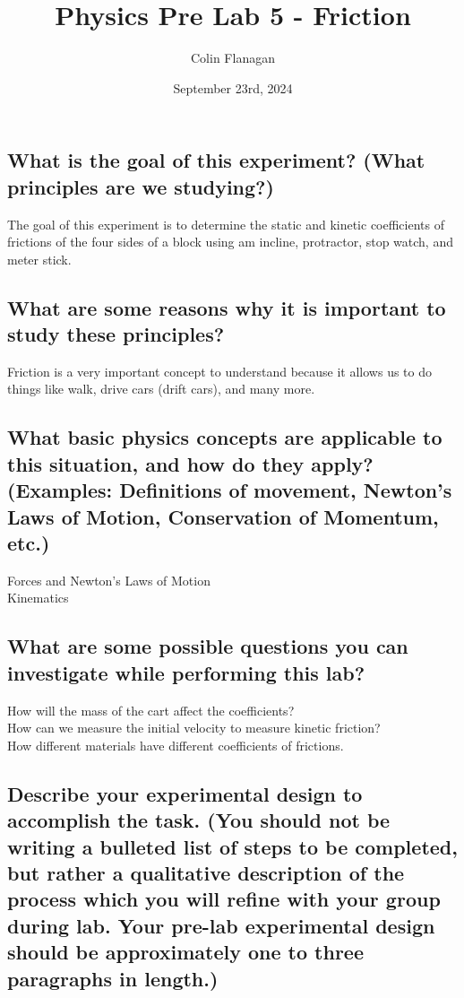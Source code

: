 \documentclass{article}
\title{Physics Pre Lab 5 - Friction}
\author{Colin Flanagan}
\date{September 23rd, 2024}
\begin{document}
\maketitle

\subsection*{What is the goal of this experiment? (What principles are we studying?)}

    The goal of this experiment is to determine the static and kinetic coefficients of frictions of the four sides of a block using am incline, protractor, stop watch, and meter stick.
    

\subsection*{What are some reasons why it is important to study these principles?
}

    Friction is a very important concept to understand because it allows us to do things like walk, drive cars (drift cars), and many more.  
    
\subsection*{What basic physics concepts are applicable to this situation, and how do they apply? (Examples: Definitions of movement, Newton’s Laws of Motion, Conservation of Momentum, etc.)}

    Forces and Newton's Laws of Motion\\
    Kinematics

\subsection*{What are some possible questions you can investigate while performing this lab?
}

   How will the mass of the cart affect the coefficients? \\
   
   How can we measure the initial velocity to measure kinetic friction?\\

   How different materials have different coefficients of frictions.\\

\subsection*{Describe your experimental design to accomplish the task. (You should not be writing a bulleted list of steps to be completed, but rather a qualitative description of the process which you will refine with your group during lab. Your pre-lab experimental design should be approximately one to three paragraphs in length.)}
\end{document}
